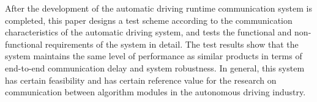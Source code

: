 \begin{abstract*}
  After the development of the automatic driving runtime communication system is completed, 
  this paper designs a test scheme according to the communication characteristics of the automatic driving system, 
  and tests the functional and non-functional requirements of the system in detail. 
  The test results show that the system maintains the same level of performance as similar products in terms of end-to-end communication delay and system robustness. 
  In general, this system has certain feasibility and has certain reference value for the research on communication between algorithm modules in the autonomous driving industry.
\end{abstract*}
